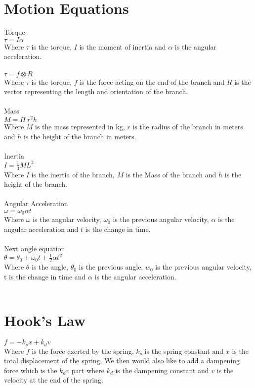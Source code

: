 \section{Motion Equations}

Torque\\
$ \tau = I\alpha $ \\
Where $\tau$ is the torque, $I$ is the moment of inertia and $\alpha$ is the angular acceleration.\\
\\
$ \tau = f \otimes R $ \\
Where $\tau$ is the torque, $f$ is the force acting on the end of the branch and $R$ is the vector representing the length and orientation of the branch. \\
\\
Mass \\
$ M = \Pi~ r ^ 2 h $  \\
Where $M$ is the mass represented in kg, $r$ is the radius of the branch in meters and $h$ is the height of the branch in meters. \\
\\
Inertia\\
$ I = \frac{1}{3} M L ^ 2 $ \\ 
Where $I$ is the inertia of the branch, $M$ is the Mass of the branch and $h$ is the height of the branch. \\
\\
Angular Acceleration\\
$ \omega = \omega _0 \alpha t $ \\
Where $\omega$ is the angular velocity, $\omega _0 $ is the previous angular velocity, $\alpha$ is the angular acceleration and $t$ is the change in time. \\
\\
Next angle equation\\
$ \theta = \theta _0 + \omega _0 t + \frac{1}{2} \alpha t ^2 $ \\
Where $\theta$ is the angle, $\theta _0$ is the previous angle, $w _0$ is the previous angular velocity, t is the change in time and $\alpha$ is the angular acceleration. \\
\\

\section{Hook's Law}

$ f = -k _s x + k _d v$\\
Where $f$ is the force exerted by the spring, $k _s$ is the spring constant and $x$ is the total displacement of the spring. We then would also like to add a dampening force which is the $k _d v$ part where $k _d$ is the dampening constant and $v$ is the velocity at the end of the spring.\\

